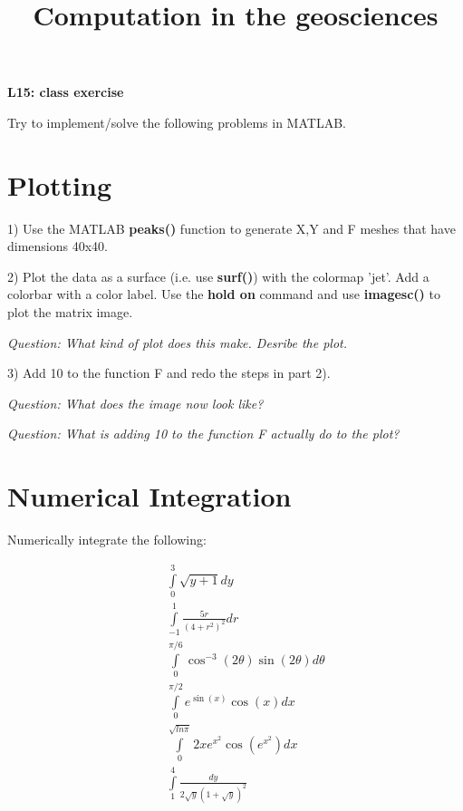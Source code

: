 \documentclass[10pt,fleqn]{article}
\title{Computation in the geosciences}
\date{\empty}
\begin{document}
\begin{multicols}{2}
\textbf{L15: class exercise}
\end{multicols}

Try to implement/solve the following problems in MATLAB.


\section*{Plotting}

1) Use the MATLAB \textbf{peaks()} function to generate X,Y and F meshes that have dimensions 40x40.

2) Plot the data as a surface (i.e. use \textbf{surf()}) with the colormap 'jet'. Add a colorbar with a color label. Use the \textbf{hold on} command and use \textbf{imagesc()} to plot the matrix image.

\textit{Question: What kind of plot does this make. Desribe the plot.}

3) Add 10 to the function F and redo the steps in part 2). 

\textit{Question: What does the image now look like?}

\textit{Question: What is adding 10 to the function F actually do to the plot?}


\section*{Numerical Integration}

Numerically integrate the following:

\begin{eqnarray} \nonumber
&& \int\limits_0^{3} \sqrt{y+1} dy \\ \nonumber
&& \int\limits_{-1}^{1} \frac{5r}{(4+r^2)^2} dr  \\ \nonumber
&& \int\limits_0^{\pi/6} \cos^{-3}(2\theta) \sin(2\theta) d\theta \\ \nonumber
&& \int\limits_0^{\pi/2} e^{\sin(x)}\cos(x) dx \\ \nonumber
&& \int\limits_0^{\sqrt{ln\pi}} 2xe^{x^2}\cos(e^{x^2}) dx  \\ \nonumber
&& \int\limits_1^{4} \frac{dy}{2\sqrt{y}(1+\sqrt{y})^2}  \\ \nonumber
\end{eqnarray}
\end{document}
